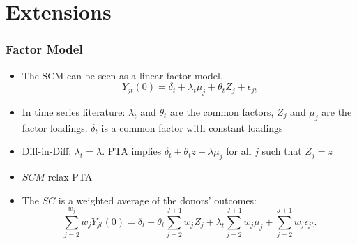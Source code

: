 \documentclass[xcolor=svgnames,t]{beamer}
\begin{document}
\section{Extensions}
\begin{frame}
    \frametitle{Factor Model}
    \begin{itemize}
        \item<1-> The SCM can be seen as a linear factor model.
        $$Y_{jt}(0)=\delta_t+\lambda_t\mu_j+\theta_t Z_j+\epsilon_{jt} $$
        \item <2-> In time series literature: $\lambda_t$ and  $\theta_t$ are the common factors, $Z_j$ 
        and $\mu_j$ are the factor loadings. $\delta_t$ is a common factor with constant loadings
        \item <3-> Diff-in-Diff: $\lambda_t=\lambda$. PTA implies $\delta_t+\theta_tz+\lambda\mu_j$ for all $j$ such that $Z_j=z$
        \item <4-> $SCM$ relax PTA
        \item <5-> The $SC$ is a weighted average of the donors' outcomes:
        $$ \sum_{j=2}^{w_j} w_j Y_{jt}(0) = \delta_t + \theta_{t} \sum_{j=2}^{J+1}w_j Z_j + \lambda_{t} \sum^{J+1}_{j=2} w_j \mu_j + \sum_{j=2}^{J+1} w_j \epsilon_{jt}.
        $$
    \end{itemize}
    

\end{frame}
\end{document}
